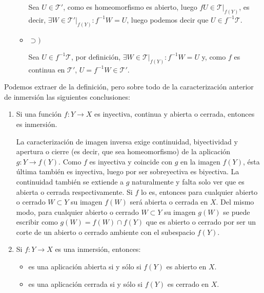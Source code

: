 \begin{demo}
\begin{itemize}
\begin{itemize}
        Sea $U \in \mathcal{T}'$, como es homeomorfismo es abierto, luego $fU\in \mathcal{T}|_{f\left( Y \right)}$, es decir, $\exists W \in \mathcal{T}'|_{f\left( Y \right)}: f^{-1}W = U$, luego podemos decir que $U \in f^{-1}\mathcal{T}$. 
        \item $\supset)$
        
        Sea $U \in f^{-1}\mathcal{T}$, por definición, $\exists W \in \mathcal{T}|_{f\left( Y \right)}: f^{-1}W = U$ y, como $f$ es continua en $\mathcal{T}'$, $U = f^{-1} W \in \mathcal{T}'$.
    \end{itemize}
\end{itemize} 
\end{demo}

\begin{obs}
Podemos extraer de la definición, pero sobre todo de la caracterización anterior de inmersión las siguientes conclusiones:
\begin{enumerate}
    \item Si una función $f: Y \rightarrow X$ es inyectiva, continua y abierta o cerrada, entonces es inmersión.
    \begin{demo}
    La caracterización de imagen inversa exige continuidad, biyectividad y apertura o cierre (es decir, que sea homeomorfismo) de la aplicación $g: Y \rightarrow f(Y)$. Como $f$ es inyectiva y coincide con $g$ en la imagen $f(Y)$, ésta última también es inyectiva, luego por ser sobreyectiva es biyectiva. La continuidad también se extiende a $g$ naturalmente y falta solo ver que es abierta o cerrada respectivamente. Si $f$ lo es, entonces para cualquier abierto o cerrado $W\subset Y$ su imagen $f(W)$ será abierta o cerrada en $X$. Del mismo modo, para cualquier abierto o cerrado $W\subset Y$ su imagen $g(W)$ se puede escribir como $g(W) = f(W)\cap f(Y)$ que es abierto o cerrado por ser un corte de un abierto o cerrado ambiente con el subespacio $f(Y)$.
    \end{demo}

    \item Si $f: Y \rightarrow X$ es una inmersión, entonces:
	\begin{itemize}
		\item es una aplicación abierta si y sólo si 	$f(Y)$ es abierto en $X$.
		\item es una aplicación cerrada si y sólo si $f(Y)$ es cerrado en $X$.
	\end{itemize}	    
    

\end{enumerate}
\end{obs}
